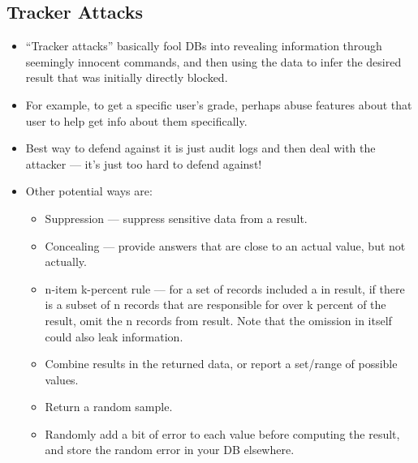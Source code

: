 \documentclass{article}
\begin{document}
\subsection{Tracker Attacks}
\begin{itemize}
    \item ``Tracker attacks'' basically fool DBs into revealing information through seemingly innocent commands, and then using the data to infer the desired result that was initially directly blocked.
    \item For example, to get a specific user's grade, perhaps abuse features about that user to help get info about them specifically.
    \item Best way to defend against it is just audit logs and then deal with the attacker --- it's just too hard to defend against!
    \item Other potential ways are:
        \begin{itemize}
            \item Suppression --- suppress sensitive data from a result.
            \item Concealing --- provide answers that are close to an actual value, but not actually.
            \item n-item k-percent rule --- for a set of records included a in result, if there is a subset of n records that are responsible for over k percent of the result, omit the n records from result.  Note that the omission in itself could also leak information.
            \item Combine results in the returned data, or report a set/range of possible values.
            \item Return a random sample.
            \item Randomly add a bit of error to each value before computing the result, and store the random error in your DB elsewhere.
        \end{itemize}
\end{itemize}
\end{document}
